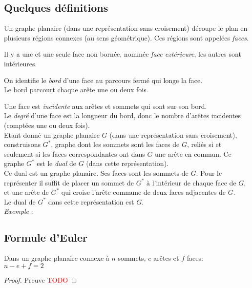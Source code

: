 \subsection*{Quelques définitions}
Un graphe planaire (dans une représentation sans croisement) découpe le plan en plusieurs régions connexes (au sens géométrique). Ces régions sont appelées \textit{faces}.

Il y a une et une seule face non bornée, nommée \textit{face extérieure}, les autres sont intérieures.

On identifie le \textit{bord }d'une face au parcours fermé qui longe la face.\\
Le bord parcourt chaque arête une ou deux fois.

Une face est \textit{incidente} aux arêtes et sommets qui sont sur son bord.\\

Le \textit{degré} d'une face est la longueur du bord, donc le nombre d'arêtes incidentes (comptées une ou deux fois).\\

Etant donné un graphe planaire $G$ (dans une représentation sans croisement), construisons $G^*$, graphe dont les sommets sont les faces de $G$, reliés si et seulement si les faces correspondantes ont dans $G$ une arête en commun. Ce graphe $G^*$ est le \textit{dual} de $G$ (dans cette représentation).\\
Ce dual est un graphe planaire. Ses faces sont les sommets de $G$. Pour le représenter il suffit de placer un sommet de $G^*$ à l'intérieur de chaque face de $G$, et une arête de $G^*$ qui croise l'arête commune de deux faces adjacentes de $G$.\\
Le dual de $G^*$ dans cette représentation est $G$.\\

\noindent
\textit{Exemple} : \\


\subsection{Formule d'Euler}
\begin{mytheo} 
  Dans un graphe planaire connexe à $n$ sommets, $e$ arêtes et $f$ faces:\\
  $n−e+f =2$
  \begin{proof}
    Preuve \textcolor{red}{TODO}
  \end{proof}
\end{mytheo}

